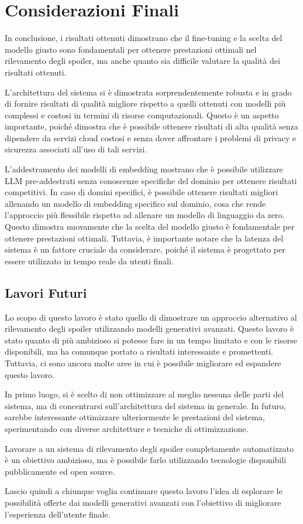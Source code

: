 \chapter{Considerazioni Finali}
\label{ch:owari}

In conclusione, i risultati ottenuti dimostrano che il
fine-tuning e la scelta del modello giusto sono
fondamentali per ottenere prestazioni ottimali nel
rilevamento degli spoiler, ma anche quanto sia difficile
valutare la qualità dei risultati ottenuti.

L'architettura del sistema si è dimostrata
sorprendentemente robusta e in grado di fornire risultati
di qualità migliore rispetto a quelli ottenuti con modelli
più complessi e costosi in termini di risorse
computazionali.
Questo è un aspetto importante, poiché dimostra che è
possibile ottenere risultati di alta qualità senza
dipendere da servizi cloud costosi e senza dover affrontare
i problemi di privacy e sicurezza associati all'uso di tali
servizi.

L'addestramento dei modelli di embedding mostrano che è
possibile utilizzare LLM pre-addestrati senza conoscenze
specifiche del dominio per ottenere risultati competitivi.
In caso di domini specifici, è possibile ottenere risultati
migliori allenando un modello di embedding specifico sul
dominio, cosa che rende l'approccio più flessibile rispetto
ad allenare un modello di linguaggio da zero.
Questo dimostra nuovamente che la scelta del modello giusto
è fondamentale per ottenere prestazioni ottimali.
Tuttavia, è importante notare che la latenza del sistema è
un fattore cruciale da considerare, poiché il sistema è
progettato per essere utilizzato in tempo reale da utenti
finali.

\section{Lavori Futuri}
\label{sec:future-work}

Lo scopo di questo lavoro è stato quello di dimostrare un
approccio alternativo al rilevamento degli spoiler
utilizzando modelli generativi avanzati.
Questo lavoro è stato quanto di più ambizioso si potesse
fare in un tempo limitato e con le risorse disponibili, ma
ha comunque portato a risultati interessante e promettenti.
Tuttavia, ci sono ancora molte aree in cui è possibile
migliorare ed espandere questo lavoro.

In primo luogo, si è scelto di non ottimizzare al meglio
nessuna delle parti del sistema, ma di concentrarsi
sull'architettura del sistema in generale.
In futuro, sarebbe interessante ottimizzare ulteriormente
le prestazioni del sistema, sperimentando con diverse
architetture e tecniche di ottimizzazione.

Lavorare a un sistema di rilevamento degli spoiler
completamente automatizzato è un obiettivo ambizioso, ma è
possibile farlo utilizzando tecnologie disponibili
pubblicamente ed open source.

Lascio quindi a chiunque voglia continuare questo lavoro
l'idea di esplorare le possibilità offerte dai modelli
generativi avanzati con l'obiettivo di migliorare
l'esperienza dell'utente finale.
